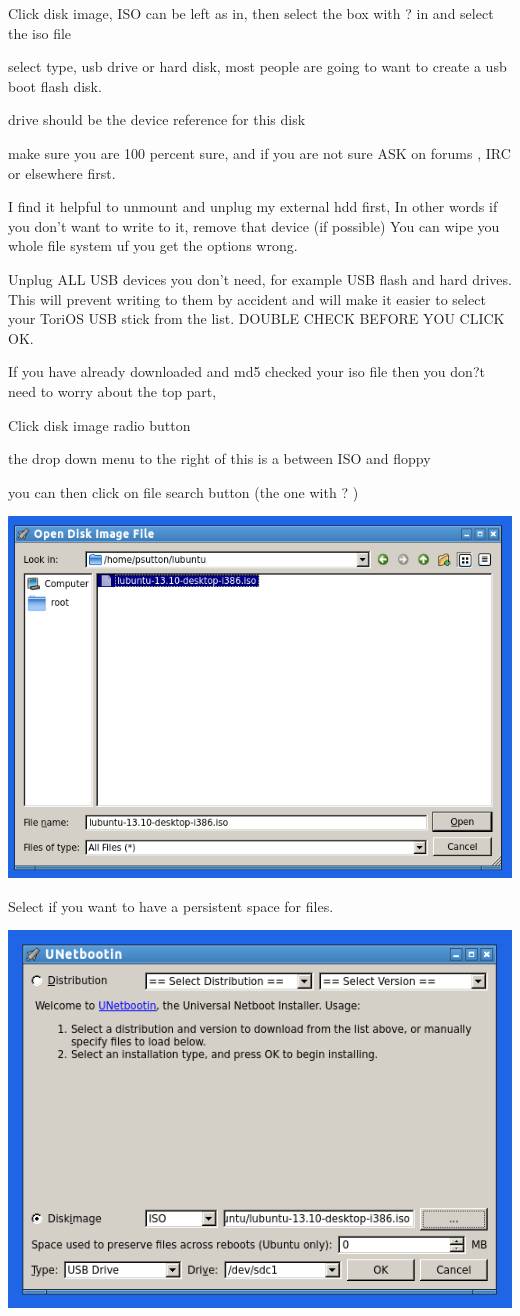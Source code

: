 \documentclass[12pt,a4paper]{book}
\begin{document}
Click disk image,  ISO can be left as in,  then select the box with ? in and select the iso file

select type, usb drive or hard disk,  most people are going to want to create a usb boot flash disk.

drive should be the device reference for this disk

make sure you are 100 percent sure,  and if you are not sure ASK on forums , IRC or elsewhere first.

I find it helpful to unmount and unplug my external hdd first,  In other words if you don't want to write to it,  remove that device (if possible)  You can wipe you whole file system uf you get the options wrong. 

Unplug ALL USB devices you don't need, for example USB flash and hard drives. This will prevent writing to them by accident and will make it easier to select your ToriOS  USB stick from the list.  DOUBLE CHECK BEFORE YOU CLICK OK. 

If you have already downloaded and md5 checked your iso file then you don?t need to worry about the top part,

Click disk image radio button

the drop down menu to the right of this is a between ISO and floppy

you can then click on file search button (the one with ? )
\begin{center}
\includegraphics[width=0.7\linewidth]{screen-shots/unetbootin2} 

\end{center}



Select if you want to have a persistent space for files.


\begin{center}
\includegraphics[width=0.7\linewidth]{screen-shots/unetbootin3}
\end{center}
\end{document}
